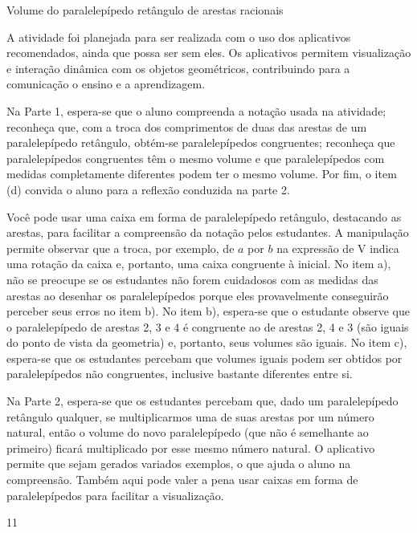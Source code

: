 \clearmargin
\begin{sugestions}{Volume do paralelepípedo retângulo de arestas racionais}
{
A atividade foi planejada para ser realizada com o uso dos aplicativos recomendados, ainda que possa ser sem eles. Os aplicativos permitem visualização e interação dinâmica com os objetos  geométricos, contribuindo para a comunicação o ensino e a aprendizagem.

Na Parte 1, espera-se que o aluno compreenda a notação usada na atividade; reconheça que, com a troca dos comprimentos de duas das arestas de um paralelepípedo retângulo, obtém-se paralelepípedos congruentes; reconheça que paralelepípedos congruentes têm o mesmo volume e que paralelepípedos com medidas completamente diferentes podem ter o mesmo volume. Por fim, o item (d) convida o aluno para a reflexão conduzida na parte 2.

Você pode usar uma caixa em forma de paralelepípedo retângulo, destacando as arestas, para facilitar a compreensão da notação pelos estudantes. A manipulação permite observar que a troca, por exemplo, de \(a\) por \(b\) na expressão de V indica uma rotação da caixa e, portanto, uma caixa congruente à inicial.
No item a), não se preocupe se os estudantes não forem cuidadosos com as medidas das arestas ao desenhar os paralelepípedos porque eles provavelmente conseguirão perceber seus erros no item b).
No item b), espera-se que o estudante observe que o paralelepípedo de arestas 2, 3 e 4 é congruente ao de arestas 2, 4 e 3 (são iguais do ponto de vista da geometria) e, portanto, seus volumes são iguais.
No item c), espera-se que os estudantes percebam que volumes iguais podem ser obtidos por paralelepípedos não congruentes, inclusive bastante diferentes entre si.

Na Parte 2, espera-se que os estudantes percebam que, dado um paralelepípedo retângulo qualquer, se multiplicarmos uma de suas arestas por um número natural, então o volume do novo paralelepípedo (que não é semelhante ao primeiro) ficará multiplicado por esse mesmo número natural. O aplicativo permite que sejam gerados variados exemplos, o que ajuda o aluno na compreensão. Também aqui pode valer a pena usar caixas em forma de paralelepípedos para facilitar a visualização.
}{1}{1}
\end{sugestions}
\clearmargin
